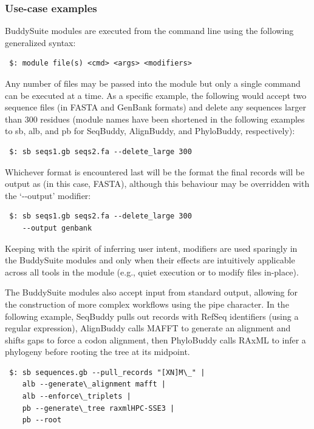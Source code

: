 \documentclass[nogrid]{MBE_article}%
\begin{document}
\subsubsection{Use-case examples}
BuddySuite modules are executed from the command line using the following generalized syntax:

\smallskip

{\small
\begin{verbatim}
 $: module file(s) <cmd> <args> <modifiers>
\end{verbatim}
}
\smallskip

Any number of files may be passed into the module but only a single command can be executed at a time. As a specific example, the following would accept two sequence files (in FASTA and GenBank formats) and delete any sequences larger than 300 residues (module names have been shortened in the following examples to sb, alb, and pb for SeqBuddy, AlignBuddy, and PhyloBuddy, respectively):

\smallskip

{\small
\begin{verbatim}
 $: sb seqs1.gb seqs2.fa --delete_large 300
\end{verbatim}
}
\smallskip

Whichever format is encountered last will be the format the final records will be output as (in this case, FASTA), although this behaviour may be overridden with the `-{}-output' modifier:

\smallskip

{\small
\begin{verbatim}
 $: sb seqs1.gb seqs2.fa --delete_large 300
    --output genbank
\end{verbatim}
}
\smallskip

Keeping with the spirit of inferring user intent, modifiers are used sparingly in the BuddySuite modules and only when their effects are intuitively applicable across all tools in the module (e.g., quiet execution or to modify files in-place).

The BuddySuite modules also accept input from standard output, allowing for the construction of more complex workflows using the pipe character. In the following example, SeqBuddy pulls out records with RefSeq identifiers (using a regular expression), AlignBuddy calls MAFFT to generate an alignment and shifts gaps to force a codon alignment, then PhyloBuddy calls RAxML to infer a phylogeny before rooting the tree at its midpoint.

\smallskip
{\small
\begin{verbatim}
 $: sb sequences.gb --pull_records "[XN]M\_" |
    alb --generate\_alignment mafft |
    alb --enforce\_triplets |
    pb --generate\_tree raxmlHPC-SSE3 |
    pb --root
\end{verbatim}
}
\end{document}
